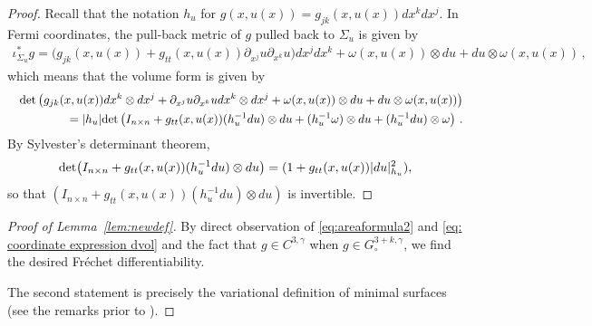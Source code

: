 \documentclass[11pt]{amsart}
\theoremstyle{definition}
\numberwithin{equation}{section}
\begin{document}
\begin{proof}
Recall that the notation $h_u$   for $g(x,u(x))=g_{jk}(x,u(x))dx^kdx^j$. In Fermi coordinates, the pull-back metric of $g$ pulled back to $\Sigma_u$ is given by
\begin{eqnarray}
\label{eq: pullback metric}\nonumber
\iota_{\Sigma_u}^* g =\big( g_{jk}(x, u(x))  + g_{tt}(x,u(x)) \partial_{x^j} u \partial_{x^k}u\big) dx^j dx^k + \omega(x,u(x)) \otimes du + du \otimes \omega(x,u(x))\,,
\end{eqnarray}
which means that the volume form is given by 
\begin{eqnarray}
&&{\rm det}\left(g_{jk}(x, u(x))dx^k \otimes dx^j  + \partial_{x^j} u \partial_{x^k}u dx^k\otimes dx^j+ \omega(x,u(x)) \otimes du + du \otimes \omega(x,u(x))\right)\\\nonumber
&&  = |h_u| {\rm det}\left(I_{n\times n} + g_{tt}(x,u(x))(h_u^{-1} du) \otimes du + (h_u^{-1} \omega) \otimes du+ (h_u^{-1} du) \otimes \omega\right)\,. %
\end{eqnarray}
By Sylvester's determinant theorem,
$${\rm det}\big(I_{n\times n} + g_{tt}(x,u(x))(h_u^{-1} du) \otimes du\big) = (1 +g_{tt}(x,u(x)) |du|_{h_u}^2),$$
so that $(I_{n\times n} + g_{tt}(x,u(x))(h_u^{-1} du) \otimes du) $ is invertible.
\end{proof}
\begin{proof}[Proof of Lemma~\ref{lem:newdef}]
By direct observation of \eqref{eq:areaformula2} and \eqref{eq: coordinate expression dvol} and the fact that $g\in C^{3,\gamma}$ when $g\in G^{3+k,\gamma}_\circ$, we find the desired Fr\'echet differentiability.

The second statement is precisely the variational definition of minimal surfaces (see the remarks prior to \cite[Chp.~1,~Def.~1.4]{MR2780140}).
\end{proof}
\end{document}
